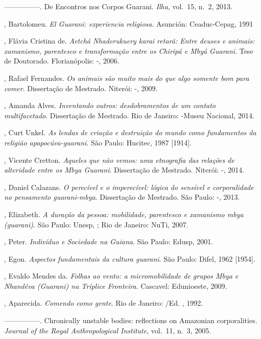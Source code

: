 \begin{Parskip}
—————. De Encontros nos Corpos Guarani. \emph{Ilha}, vol.~15, n.~2, 2013.

, Bartolomeu. \emph{El Guarani: experiencia religiosa}. Asunción:
Ceaduc-Cepag, 1991

, Flávia Cristina de. \emph{Aetchá Nhaderukuery karai retarã: Entre
deuses e animais: xamanismo, parentesco e transformação entre os
Chiripá e Mbyá Guarani}. Tese de Doutorado. Florianópolis: -,
2006.

 , Rafael Fernandes. \emph{Os animais são muito mais do que algo
somente bom para comer}. Dissertação de Mestrado. Niterói: -,
2009.

, Amanda Alves. \emph{Inventando outros: desdobramentos de um contato
multifacetado}. Dissertação de Mestrado. Rio de Janeiro: -Museu
Nacional, 2014.

, Curt Unkel. \emph{As lendas de criação e destruição do mundo como
fundamentos da religião apapocúva-guarani}. São Paulo: Hucitec, 1987
[1914].

, Vicente Cretton. \emph{Aqueles que não vemos: uma etnografia das
relações de alteridade entre os Mbya Guarani}. Dissertação de Mestrado.
Niterói: -, 2014.

, Daniel Calazans. \emph{O perecível e o imperecível: lógica do sensível
e corporalidade no pensamento guarani-mbya}. Dissertação de Mestrado.
São Paulo: -, 2013.

, Elizabeth. \emph{A duração da pessoa: mobilidade, parentesco e
xamanismo mbya (guarani)}. São Paulo: Unesp, ; Rio de Janeiro: NuTi,
2007.

, Peter. \emph{Indivíduo e Sociedade na Guiana}. São Paulo: Edusp, 2001.

, Egon. \emph{Aspectos fundamentais da cultura guarani}. São Paulo:
Difel, 1962 [1954]. 

, Evaldo Mendes da. \emph{Folhas ao vento: a micromobilidade de grupos
Mbya e Nhandéva (Guarani) na Tríplice Fronteira}. Cascavel: Edunioeste,
2009.

, Aparecida. \emph{Comendo como gente}. Rio de Janeiro: /Ed. ,
1992.

—————. Chronically unstable bodies: reflections on Amazonian
corporalities. \emph{Journal of the Royal Anthropological Institute}, vol.~11, n.~3,
2005.


\end{Parskip}
